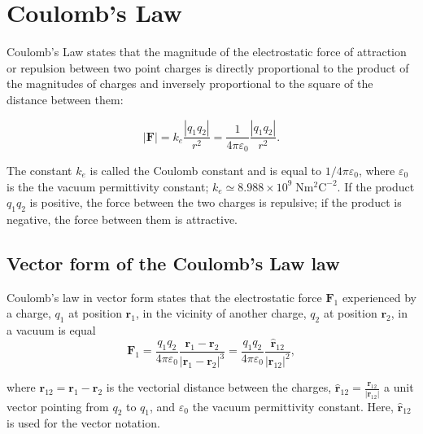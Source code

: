 \documentclass[
  9pt,
]{extbook}
\theoremstyle{definition}
\theoremstyle{definition}
\theoremstyle{definition}
\theoremstyle{remark}
\begin{document}
\hypertarget{coulombs-law}{%
\section{Coulomb's Law}\label{coulombs-law}}

Coulomb's Law states that the magnitude of the electrostatic force of attraction or repulsion between two point charges is directly proportional to the product of the magnitudes of charges and inversely proportional to the square of the distance between them:

\begin{equation}
|\mathbf{F}| = k_e \frac{|q_1q_2|}{r^2} = \frac{1}{4\pi\varepsilon_0}\frac{|q_1q_2|}{r^{2}}.
\label{eq:coulomb1}
\end{equation}

The constant \(k_e\) is called the Coulomb constant and is equal to \({1}/{4\pi\varepsilon_0}\), where \(\varepsilon_0\) is the the vacuum permittivity constant; \(k_e \simeq 8.988\times10^9\;\mathrm{Nm^2C^{-2}}\). If the product \(q_1q_2\) is positive, the force between the two charges is repulsive; if the product is negative, the force between them is attractive.

\hypertarget{vector-form-of-the-coulombs-law-law}{%
\subsection{Vector form of the Coulomb's Law law}\label{vector-form-of-the-coulombs-law-law}}

Coulomb's law in vector form states that the electrostatic force \({\textstyle \mathbf {F}_{1}}\) experienced by a charge, \(q_{1}\) at position \(\mathbf {r}_{1}\), in the vicinity of another charge, \(q_{2}\) at position \(\mathbf {r}_{2}\), in a vacuum is equal
\begin{equation}
{\displaystyle \mathbf{F}_{1}={\frac {q_{1}q_{2}}{4\pi \varepsilon _{0}}}{\frac {\mathbf{r}_{1}-\mathbf{r}_{2}}{|\mathbf {r}_{1}-\mathbf{r}_{2}|^{3}}}={\frac {q_{1}q_{2}}{4\pi \varepsilon_{0}}}{\frac{\mathbf{\hat{r}} _{12}}{|\mathbf {r} _{12}|^{2}}}},
\label{eq:coulomb2}
\end{equation}

where \({\textstyle {\boldsymbol {r}}_{12}={\boldsymbol {r}}_{1}-{\boldsymbol {r}}_{2}}\) is the vectorial distance between the charges, \({\textstyle {\widehat {\mathbf {r} }}_{12}={\frac {\mathbf {r} _{12}}{|\mathbf {r} _{12}|}}}\) a unit vector pointing from \({\textstyle q_{2}}\) to \({\textstyle q_{1}}\), and \(\varepsilon_{0}\) the vacuum permittivity constant. Here, \({\textstyle \mathbf {\hat {r}} _{12}}\) is used for the vector notation.
\end{document}
